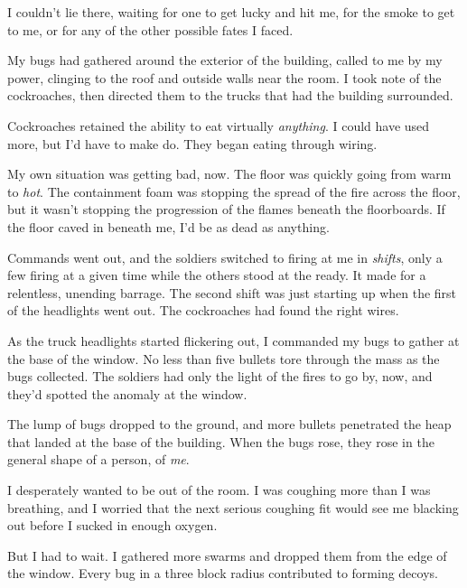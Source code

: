 I couldn't lie there, waiting for one to get lucky and hit me, for the smoke to get to me, or for any of the other possible fates I faced.



My bugs had gathered around the exterior of the building, called to me by my power, clinging to the roof and outside walls near the room.  I took note of the cockroaches, then directed them to the trucks that had the building surrounded.



Cockroaches retained the ability to eat virtually \emph{anything}.  I could have used more, but I'd have to make do. They began eating through wiring.



My own situation was getting bad, now.  The floor was quickly going from warm to \emph{hot}.  The containment foam was stopping the spread of the fire across the floor, but it wasn't stopping the progression of the flames beneath the floorboards.  If the floor caved in beneath me, I'd be as dead as anything.



Commands went out, and the soldiers switched to firing at me in \emph{shifts}, only a few firing at a given time while the others stood at the ready.  It made for a relentless, unending barrage.  The second shift was just starting up when the first of the headlights went out.  The cockroaches had found the right wires.



As the truck headlights started flickering out, I commanded my bugs to gather at the base of the window.  No less than five bullets tore through the mass as the bugs collected.  The soldiers had only the light of the fires to go by, now, and they'd spotted the anomaly at the window.



The lump of bugs dropped to the ground, and more bullets penetrated the heap that landed at the base of the building.  When the bugs rose, they rose in the general shape of a person, of \emph{me}.



I desperately wanted to be out of the room.  I was coughing more than I was breathing, and I worried that the next serious coughing fit would see me blacking out before I sucked in enough oxygen.



But I had to wait.  I gathered more swarms and dropped them from the edge of the window.  Every bug in a three block radius contributed to forming decoys.




